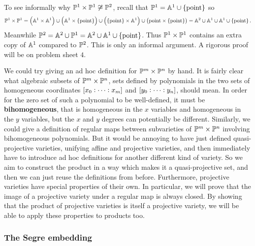 \begin{example*}
To see informally why $ \PP^1 \times \PP^1 \not\cong \PP^2 $, recall that $ \PP^1 = \AA^1 \cup \cbr{\text{point}} $ so
$$ \PP^1 \times \PP^1 = \br{\AA^1 \times \AA^1} \cup \br{\AA^1 \times \cbr{\text{point}}} \cup \br{\cbr{\text{point}} \times \AA^1} \cup \br{\text{point} \times \cbr{\text{point}}} = \AA^2 \cup \AA^1 \cup \AA^1 \cup \cbr{\text{point}}. $$
Meanwhile $ \PP^2 = \AA^2 \cup \PP^1 = \AA^2 \cup \AA^1 \cup \cbr{\text{point}} $. Thus $ \PP^1 \times \PP^1 $ contains an extra copy of $ \AA^1 $ compared to $ \PP^2 $. This is only an informal argument. A rigorous proof will be on problem sheet $ 4 $.
\end{example*}

We could try giving an ad hoc definition for $ \PP^m \times \PP^n $ by hand. It is fairly clear what algebraic subsets of $ \PP^m \times \PP^n $, sets defined by polynomials in the two sets of homogeneous coordinates $ \sbr{x_0 : \dots : x_m} $ and $ \sbr{y_0 : \dots : y_n} $, should mean. In order for the zero set of such a polynomial to be well-defined, it must be \textbf{bihomogeneous}, that is homogeneous in the $ x $ variables and homogeneous in the $ y $ variables, but the $ x $ and $ y $ degrees can potentially be different. Similarly, we could give a definition of regular maps between subvarieties of $ \PP^m \times \PP^n $ involving bihomogeneous polynomials. But it would be annoying to have just defined quasi-projective varieties, unifying affine and projective varieties, and then immediately have to introduce ad hoc definitions for another different kind of variety. So we aim to construct the product in a way which makes it a quasi-projective set, and then we can just reuse the definitions from before. Furthermore, projective varieties have special properties of their own. In particular, we will prove that the image of a projective variety under a regular map is always closed. By showing that the product of projective varieties is itself a projective variety, we will be able to apply these properties to products too.

\pagebreak

\subsubsection{The Segre embedding}

